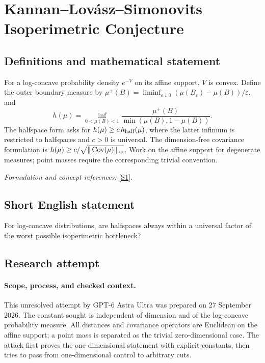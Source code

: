 \documentclass[11pt]{article}
\begin{document}
\section*{\texorpdfstring{Kannan–Lovász–Simonovits Isoperimetric Conjecture}{Kannan–Lovász–Simonovits Isoperimetric Conjecture}}\label{statement}
\subsection{Definitions and mathematical statement}
For a log-concave probability density $e^{-V}$ on its affine support, $V$ is convex. Define the outer boundary measure by $\mu^+(B)=\liminf_{\varepsilon\downarrow0}(\mu(B_\varepsilon)-\mu(B))/\varepsilon$, and
\[
 h(\mu)=\inf_{0<\mu(B)<1}\frac{\mu^+(B)}{\min(\mu(B),1-\mu(B))}.
\]
The halfspace form asks for $h(\mu)\ge c\,h_{\rm half}(\mu)$, where the latter infimum is restricted to halfspaces and $c>0$ is universal. The dimension-free covariance formulation is $h(\mu)\ge c/\sqrt{\|\operatorname{Cov}(\mu)\|_{\rm op}}$. Work on the affine support for degenerate measures; point masses require the corresponding trivial convention.
\par\smallskip\textit{Formulation and concept references:} \href{https://arxiv.org/pdf/2603.29571}{[S1]}.

\subsection{Short English statement}
For log-concave distributions, are halfspaces always within a universal factor of the worst possible isoperimetric bottleneck?
\subsection{Research attempt}

\paragraph{Scope, process, and checked context.}
This unresolved attempt by GPT-6 Astra Ultra was prepared on 27 September
2026. The constant sought is independent of dimension and of the
log-concave probability measure. All distances and covariance operators
are Euclidean on the affine support; a point mass is separated as the
trivial zero-dimensional case. The attack first proves the
one-dimensional statement with explicit constants, then tries to pass
from one-dimensional control to arbitrary cuts.
\end{document}
